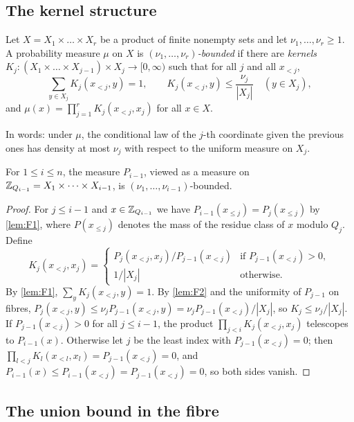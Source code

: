 \subsection{The kernel structure}\label{sec:kernel}

\begin{definition}\label{def:bounded}
Let $X=X_1\times\dots\times X_r$ be a product of finite nonempty sets and let $\nu_1,\dots,\nu_r\ge1$. A
probability measure $\mu$ on $X$ is \emph{$(\nu_1,\dots,\nu_r)$-bounded} if there are \emph{kernels}
$K_j\colon (X_1\times\dots\times X_{j-1})\times X_j\to[0,\infty)$ such that for all $j$ and all $x_{<j}$,
\[
  \sum_{y\in X_j}K_j(x_{<j},y)=1,\qquad K_j(x_{<j},y)\le\frac{\nu_j}{|X_j|}\quad(y\in X_j),
\]
and $\mu(x)=\prod_{j=1}^rK_j(x_{<j},x_j)$ for all $x\in X$.
\end{definition}

In words: under $\mu$, the conditional law of the $j$-th coordinate given the previous ones has density at most
$\nu_j$ with respect to the uniform measure on $X_j$.

\begin{lemma}\label{lem:kernel}
For $1\le i\le n$, the measure $P_{i-1}$, viewed as a measure on $\mathbb{Z}_{Q_{i-1}}=X_1\times\dots\times X_{i-1}$, is
$(\nu_1,\dots,\nu_{i-1})$-bounded.
\end{lemma}

\begin{proof}
For $j\le i-1$ and $x\in\mathbb{Z}_{Q_{i-1}}$ we have $P_{i-1}(x_{\le j})=P_j(x_{\le j})$ by \cref{lem:F1}, where
$P(x_{\le j})$ denotes the mass of the residue class of $x$ modulo $Q_j$. Define
\[
  K_j(x_{<j},x_j)=
  \begin{cases}
    P_j(x_{<j},x_j)/P_{j-1}(x_{<j}) & \text{if } P_{j-1}(x_{<j})>0,\\
    1/|X_j| & \text{otherwise.}
  \end{cases}
\]
By \cref{lem:F1}, $\sum_yK_j(x_{<j},y)=1$. By \cref{lem:F2} and the uniformity of $P_{j-1}$ on fibres,
$P_j(x_{<j},y)\le\nu_jP_{j-1}(x_{<j},y)=\nu_jP_{j-1}(x_{<j})/|X_j|$, so $K_j\le\nu_j/|X_j|$. If
$P_{j-1}(x_{<j})>0$ for all $j\le i-1$, the product $\prod_{j<i}K_j(x_{<j},x_j)$ telescopes to
$P_{i-1}(x)$. Otherwise let $j$ be the least index with $P_{j-1}(x_{<j})=0$; then
$\prod_{l<j}K_l(x_{<l},x_l)=P_{j-1}(x_{<j})=0$, and $P_{i-1}(x)\le P_{i-1}(x_{<j})=P_{j-1}(x_{<j})=0$, so both
sides vanish.
\end{proof}

\subsection{The union bound in the fibre}\label{sec:unionbound}

